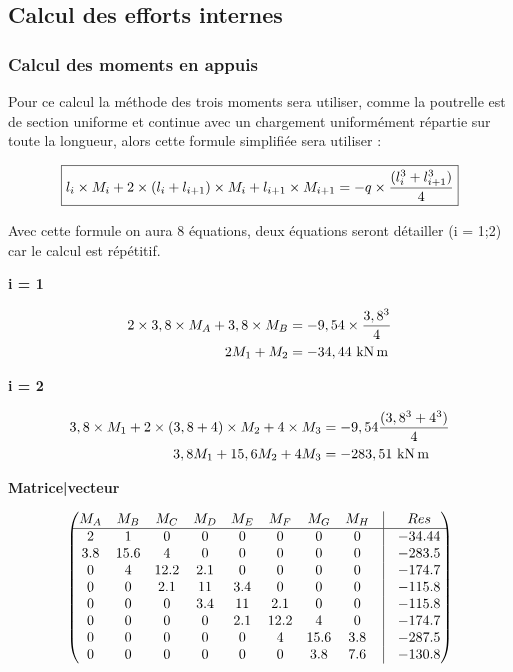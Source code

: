 \subsection{Calcul des efforts internes}


\subsubsection{Calcul des moments en appuis}

Pour ce calcul la méthode des trois moments sera utiliser, comme la poutrelle est de section uniforme et continue avec un chargement uniformément répartie sur toute la longueur, alors cette formule simplifiée sera utiliser :

\begin{equation}
	\fbox{$l_{i} \times M_{i} + 2 \times (l_{i} + l_{i + 1}) \times M_{i} + l_{i + 1} \times M_{i + 1} = -q \times \dfrac{(l_{i}^{3} + l_{i + 1}^{3})}{4} $}
\end{equation}
\vspace{2\baselineskip}

Avec cette formule on aura 8 équations, deux équations seront détailler (i = 1;2) car le calcul est répétitif.

\textbf{i = 1}

\[ \begin{aligned}
	2 \times 3,8 \times M_{A} + 3,8 \times M_{B} &= -9,54 \times \dfrac{3,8^{3}}{4} \\
	2M_{1} + M_{2} &= -34,44\knxm
\end{aligned} \]

\textbf{i = 2}

\[ \begin{aligned}
	3,8 \times M_{1} + 2 \times (3,8 + 4) \times M_{2} + 4 \times M_{3} &= -9,54\dfrac{(3,8^{3} + 4^{3})}{4} \\
	3,8M_{1} + 15,6M_{2} + 4M_{3} &= -283,51\knxm
\end{aligned} \]


\textbf{Matrice|vecteur}

\[
\begin{pmatrix}
	M_{A} & M_{B} & M_{C} & M_{D} & M_{E} & M_{F} & M_{G} & M_{H} & \vline & Res \\ \hline
	2 & 1 & 0 & 0 & 0 & 0 & 0 & 0 & \vline & -34.44 \\
	3.8 & 15.6 & 4 & 0 & 0 & 0 & 0 & 0 & \vline & -283.5 \\
	0 & 4 & 12.2 & 2.1 & 0 & 0 & 0 & 0 & \vline & -174.7 \\
	0 & 0 & 2.1 & 11 & 3.4 & 0 & 0 & 0 & \vline & -115.8 \\
	0 & 0 & 0 & 3.4 & 11 & 2.1 & 0 & 0 & \vline & -115.8 \\
	0 & 0 & 0 & 0 & 2.1 & 12.2 & 4 & 0 & \vline & -174.7 \\
	0 & 0 & 0 & 0 & 0 & 4 & 15.6 & 3.8 & \vline & -287.5 \\
	0 & 0 & 0 & 0 & 0 & 0 & 3.8 & 7.6 & \vline & -130.8
\end{pmatrix}
\]


